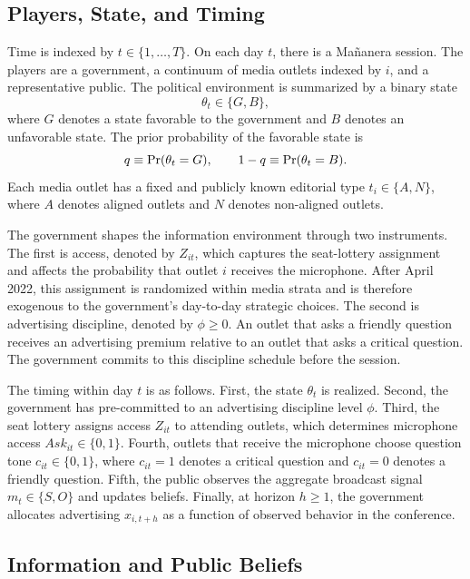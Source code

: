 \subsection{Players, State, and Timing}

Time is indexed by $t \in \{1, \ldots, T\}$. On each day $t$, there is a Ma\~nanera session. The players are a government, a continuum of media outlets indexed by $i$, and a representative public. The political environment is summarized by a binary state
\begin{equation}
    \theta_t \in \{G,B\},
\end{equation}
where $G$ denotes a state favorable to the government and $B$ denotes an unfavorable state. The prior probability of the favorable state is
\begin{equation}
    q \equiv \Pr(\theta_t = G), \qquad 1-q \equiv \Pr(\theta_t = B).
\end{equation}
Each media outlet has a fixed and publicly known editorial type $t_i \in \{A,N\}$, where $A$ denotes aligned outlets and $N$ denotes non-aligned outlets.

The government shapes the information environment through two instruments. The first is access, denoted by $Z_{it}$, which captures the seat-lottery assignment and affects the probability that outlet $i$ receives the microphone. After April 2022, this assignment is randomized within media strata and is therefore exogenous to the government's day-to-day strategic choices. The second is advertising discipline, denoted by $\phi \geq 0$. An outlet that asks a friendly question receives an advertising premium relative to an outlet that asks a critical question. The government commits to this discipline schedule before the session.

The timing within day $t$ is as follows. First, the state $\theta_t$ is realized. Second, the government has pre-committed to an advertising discipline level $\phi$. Third, the seat lottery assigns access $Z_{it}$ to attending outlets, which determines microphone access $Ask_{it} \in \{0,1\}$. Fourth, outlets that receive the microphone choose question tone $c_{it} \in \{0,1\}$, where $c_{it}=1$ denotes a critical question and $c_{it}=0$ denotes a friendly question. Fifth, the public observes the aggregate broadcast signal $m_t \in \{S,O\}$ and updates beliefs. Finally, at horizon $h \geq 1$, the government allocates advertising $x_{i,t+h}$ as a function of observed behavior in the conference.

\subsection{Information and Public Beliefs}

